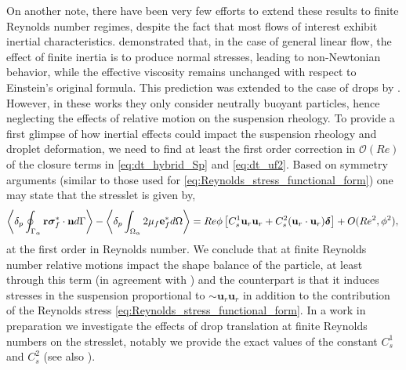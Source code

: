 On another note, there have been very few efforts to extend these results to finite Reynolds number regimes, despite the fact that most flows of interest exhibit inertial characteristics. 
\citet{stone2001inertial} demonstrated that, in the case of general linear flow, the effect of finite inertia is to produce normal stresses, leading to non-Newtonian behavior, while the effective viscosity remains unchanged with respect to Einstein's original formula. 
This prediction was extended to the case of drops by \citet{raja2010inertial}. 
However, in these works they only consider neutrally buoyant particles, hence neglecting the effects of relative motion on the suspension rheology. 
To provide a first glimpse of how inertial effects could impact the suspension rheology and droplet deformation, we need to find at least the first order correction in $\mathcal{O}(Re)$ of the closure terms in \ref{eq:dt_hybrid_Sp} and \ref{eq:dt_uf2}. 
Based on symmetry arguments (similar to those used for \ref{eq:Reynolds_stress_functional_form}) one may state that the stresslet is given by, 
\begin{equation}
    \left<\delta_{p} \oint_{\Gamma_{\alpha}} \textbf{r}\bm\sigma^*_f\cdot \textbf{n} d\Gamma\right>
    -\left<\delta_{p} \int_{\Omega_{\alpha}} 2\mu_f\textbf{e}^*_f d\Omega\right>
    =
    Re \phi 
    \left[
       C_s^1 \textbf{u}_{r}\textbf{u}_{r} 
    +  C_s^2 (\textbf{u}_{r}\cdot \textbf{u}_{r})\bm\delta
    \right]
    + O(Re^2,\phi^2),
    \\
\end{equation}
at the first order in Reynolds number. 
We conclude that at finite Reynolds number relative motions impact the shape balance of the particle, at least through this term (in agreement with \citet{taylor1964deformation}) and the counterpart is that it induces stresses in the suspension proportional to $\sim \textbf{u}_r\textbf{u}_r$ in addition to the contribution of the Reynolds stress \eqref{eq:Reynolds_stress_functional_form}. 
In a work in preparation we investigate the effects of drop translation at finite Reynolds numbers on the stresslet, notably we provide the exact values of the constant $C_s^{1}$ and $C_s^{2}$ (see also \citet{fintzi2025}). 
 

